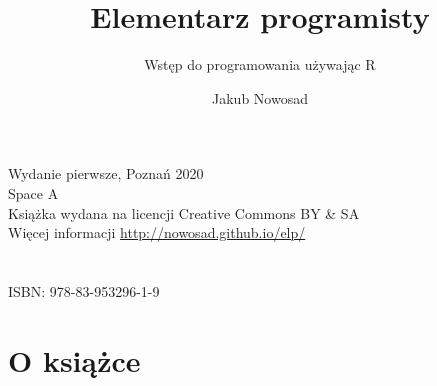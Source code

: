 \documentclass[paper=6in:9in,pagesize=pdftex,headinclude=on,footinclude=on,10pt]{scrbook}
\title{Elementarz programisty}
\subtitle{Wstęp do programowania używając R}
\author{Jakub Nowosad}
\date{}
\let\oldmaketitle\maketitle
\begin{document}
\maketitle

\thispagestyle{empty}


\let\maketitle\oldmaketitle
\maketitle

\thispagestyle{empty}
\vspace*{\fill}
Wydanie pierwsze, Poznań 2020 \\
Space A \\
Książka wydana na licencji Creative Commons BY \& SA \\
Więcej informacji \url{http://nowosad.github.io/elp/} \\
\\
\\
{\large ISBN: 978-83-953296-1-9}

{
\setcounter{tocdepth}{1}
\tableofcontents
}
\hypertarget{o-ksiux105ux17cce}{%
\chapter*{O książce}\label{o-ksiux105ux17cce}}
\end{document}

